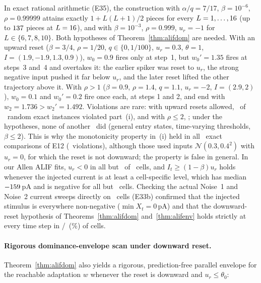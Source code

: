 \documentclass[10pt]{article}
\theoremstyle{remark}
\begin{document}
In exact rational arithmetic (E35), the construction with $\alpha/q=7/17$, $\beta=10^{-6}$, $\rho=0.99999$ attains exactly $1+L(L+1)/2$ pieces for every $L=1,\dots,16$ (up to $137$ pieces at $L=16$), and with $\beta=10^{-3}$, $\rho=0.999$, $u_r=-1$ for $L\in\{6,7,8,10\}$. Both hypotheses of Theorem~\ref{thm:alifdom} are needed. With an upward reset ($\beta=3/4$, $\rho=1/20$, $q\in\{0,1/100\}$, $u_r=0.3$, $\theta=1$, $I=(1.9,-1.9,1.3,0.9)$), $w_0=0.9$ fires only at step~1, but $w_0'=1.35$ fires at steps~3 and~4 and overtakes it: the earlier spiker was reset to $u_r$, the strong negative input pushed it far below $u_r$, and the later reset lifted the other trajectory above it. With $\rho>1$ ($\beta=0.9$, $\rho=1.4$, $q=1.1$, $u_r=-2$, $I=(2.9,2)$), $w_0=0.1$ and $w_0'=0.2$ fire once each, at steps 1 and 2, and end with $w_2=1.736>w_2'=1.492$. Violations are rare: with upward resets allowed, \AlifDomUpViol\ of \AlifDomTests\ random exact instances violated part~(i), and with $\rho\le2$, \AlifDomRhoViol; under the hypotheses, none of another \AlifDomTests\ did (general entry states, time-varying thresholds, $\beta\le2$). This is why the monotonicity property in~(i) held in all \AlifMonoChecks\ exact comparisons of E12 (\AlifMonoViol\ violations), although those used inputs $\mathcal N(0.3,0.4^2)$ with $u_r=0$, for which the reset is not downward; the property is false in general. In our Allen ALIF fits, $u_r<0$ in all but \AlifDomAllenPosUr\ of \AlifDomAllenCells\ cells, and $I_t\ge(1-\beta)u_r$ holds whenever the injected current is at least a cell-specific level, which has median ${-}159$\,pA and is negative for all but \AlifDomAllenNeedPos\ cells. Checking the actual Noise~1 and Noise~2 current sweeps directly on \AlifDownCells\ cells (E33b) confirmed that the injected stimulus is everywhere non-negative ($\min X_t=0$\,pA) and that the downward-reset hypothesis of Theorems~\ref{thm:alifdom} and~\ref{thm:alifenv} holds strictly at every time step in \AlifDownHold/\AlifDownCells\ (\AlifDownPct\%) of cells.

\paragraph{Rigorous dominance-envelope scan under downward reset.}
Theorem~\ref{thm:alifdom} also yields a rigorous, prediction-free parallel envelope for the reachable adaptation $w$ whenever the reset is downward and $u_r\le\theta_0$:
\end{document}
